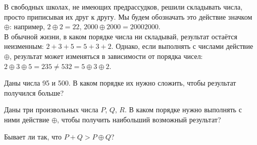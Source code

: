 ﻿
\noindent В свободных школах, не имеющих предрассудков, решили складывать числа, просто приписывая их друг к другу. Мы будем обозначать это действие значком $\oplus$: например, $2 \oplus 2 = 22$, $2000 \oplus 2000 = 20002000$. \smallskip\\
В обычной жизни, в каком порядке числа ни складывай, результат остаётся неизменным: $2+3+5 = 5+3+2$. Однако, если выполнять с числами действие $\oplus$, результат может изменяться в зависимости от порядка чисел: $2 \oplus 3 \oplus 5 = 235 \ne 532 = 5 \oplus 3 \oplus 2$.

\begin{enumerate}
\itA Даны числа 95 и 500. В каком порядке их нужно сложить, чтобы результат получился больше?

\itB Даны три произвольных числа $P$, $Q$, $R$. В каком порядке нужно выполнять с ними действие $\oplus$, чтобы получить наибольший возможный результат?

\itC Бывает ли так, что $P + Q > P \oplus Q$?
\end{enumerate}
